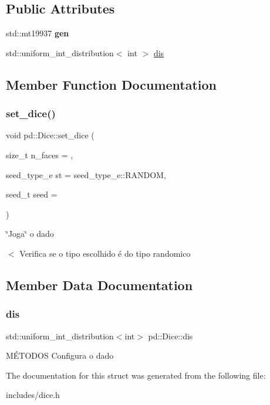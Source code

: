\subsection*{Public Attributes}
\begin{DoxyCompactItemize}
\item 
\mbox{\label{structpd_1_1Dice_a3c86df0629f7385ee703ab013ad6a5fb}} 
std\+::mt19937 {\bfseries gen}
\item 
std\+::uniform\+\_\+int\+\_\+distribution$<$ int $>$ \hyperlink{structpd_1_1Dice_ae903af79a820c4e6fcd9364f33563f62}{dis}
\end{DoxyCompactItemize}


\subsection{Member Function Documentation}
\mbox{\label{structpd_1_1Dice_a92e8fb97036501a707952d377d682e70}} 
\subsubsection{\texorpdfstring{set\+\_\+dice()}{set\_dice()}}
{\footnotesize\ttfamily void pd\+::\+Dice\+::set\+\_\+dice (\begin{DoxyParamCaption}\item[{size\+\_\+t}]{n\+\_\+faces = {},  }\item[{seed\+\_\+type\+\_\+e}]{st = {\ttfamily seed\+\_\+type\+\_\+e\+:\+:RANDOM},  }\item[{seed\+\_\+t}]{seed = {} }\end{DoxyParamCaption})\hspace{0.3cm}{\ttfamily [inline]}}



\char`\"{}\+Joga\char`\"{} o dado 

$<$ Verifica se o tipo escolhido é do tipo randomico 

\subsection{Member Data Documentation}
\mbox{\label{structpd_1_1Dice_ae903af79a820c4e6fcd9364f33563f62}} 
\subsubsection{\texorpdfstring{dis}{dis}}
{\footnotesize\ttfamily std\+::uniform\+\_\+int\+\_\+distribution$<$int$>$ pd\+::\+Dice\+::dis}

MÉ\+T\+O\+D\+OS Configura o dado 

The documentation for this struct was generated from the following file\+:\begin{DoxyCompactItemize}
\item 
includes/dice.\+h\end{DoxyCompactItemize}

